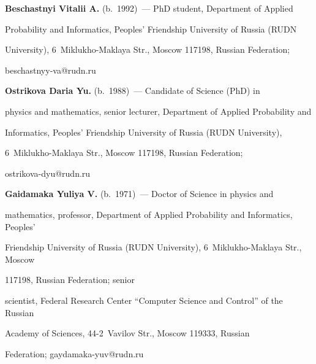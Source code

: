 \noindent


\textbf{Beschastnyi Vitalii A.} (b.\ 1992)~--- PhD student, Department of Applied 


Probability and Informatics, Peoples' Friendship University of Russia (RUDN 


University), 6~Miklukho-Maklaya Str., Moscow 117198, Russian Federation; 


\mbox{beschastnyy-va@rudn.ru}


  




  


  \noindent


  \textbf{Ostrikova Daria Yu.} (b.\ 1988)~--- Candidate of Science (PhD) in 


physics and mathematics, senior lecturer, Department of Applied Probability and 


Informatics, Peoples' Friendship University of Russia (RUDN University), 


6~Miklukho-Maklaya Str., Moscow 117198, Russian Federation;  


\mbox{ostrikova-dyu@rudn.ru}







  


  \noindent


\textbf{Gaidamaka Yuliya V.} (b.\ 1971)~--- Doctor of Science in physics and 


mathematics, professor, Department of Applied Probability and Informatics, Peoples' 


Friendship University of Russia (RUDN University), 6~Miklukho-Maklaya Str., Moscow 


117198, Russian Federation; senior 


scientist, Federal Research Center ``Computer Science and Control'' of the Russian 


Academy of Sciences, 44-2~Vavilov Str., Moscow 119333, Russian 


Federation; \mbox{gaydamaka-yuv@rudn.ru}








\label{end\stat}








\renewcommand{\bibname}{\protect\rm Литература}


  


